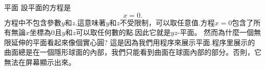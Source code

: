 \begin{surferPage}{平面}
設平面的方程是\[x=0.\]方程中不包含參數$y$和$z$.這意味著$y$和$z$不受限制，可以取任意值.方程$x=0$包含了所有無論$x$坐標為0且$y$和$z$可以取任何數的點.因此它就是$yz$-平面。
\newline \newline
然而為什麼一個無限延伸的平面看起來像個實心圓? 這是因為我們用程序來展示平面.程序里展示的曲面總是在一個隱形球面的內部，我們只能看到曲面在球面內部的部分。否則，它無法在屏幕顯示出來。
\end{surferPage}
